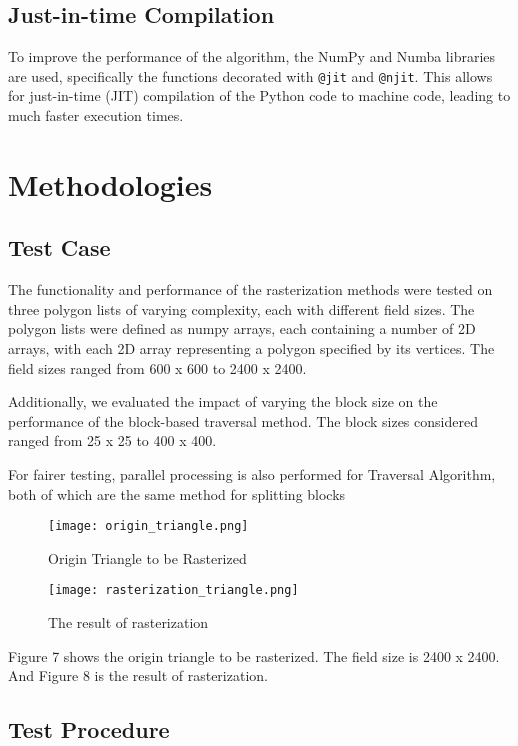 \documentclass[
	a4paper, %
	10pt, %
	unnumberedsections, %
	twoside, %
]{LTJournalArticle}
\begin{document}
\subsection{Just-in-time Compilation}

To improve the performance of the algorithm, the NumPy and Numba libraries are used, specifically the functions decorated with \texttt{@jit} and \texttt{@njit}. This allows for just-in-time (JIT) compilation of the Python code to machine code, leading to much faster execution times.

\section{Methodologies}

\subsection{Test Case}

The functionality and performance of the rasterization methods were tested on three polygon lists of varying complexity, each with different field sizes. The polygon lists were defined as numpy arrays, each containing a number of 2D arrays, with each 2D array representing a polygon specified by its vertices. The field sizes ranged from 600 x 600 to 2400 x 2400.

Additionally, we evaluated the impact of varying the block size on the performance of the block-based traversal method. The block sizes considered ranged from 25 x 25 to 400 x 400.

For fairer testing, parallel processing is also performed for Traversal Algorithm, both of which are the same method for splitting blocks

\begin{figure}[H] %
	\texttt{[image: origin\_triangle.png]}
	\caption{Origin Triangle to be Rasterized}
\end{figure}

\begin{figure}[H] %
	\texttt{[image: rasterization\_triangle.png]}
	\caption{The result of rasterization}
\end{figure}

Figure 7 shows the origin triangle to be rasterized. The field size is 2400 x 2400. And Figure 8 is the result of rasterization.

\subsection{Test Procedure}
\end{document}
